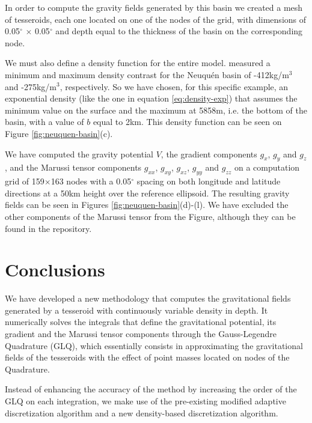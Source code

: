 \documentclass[extra]{gji}
\begin{document}
In order to compute the gravity fields generated by this basin we created a 
mesh of tesseroids, each one located on one of the nodes of the grid, with 
dimensions of 0.05$^\circ$ $\times$ 0.05$^\circ$ and depth equal to the 
thickness of the basin on the corresponding node.

We must also define a density function for the entire model. 
\citet{Sigismondi2012} measured a minimum and maximum density contrast for 
the Neuqu\'en basin of -412kg/m$^3$ and -275kg/m$^3$, respectively.
So we have chosen, for this specific example, an exponential density (like the 
one in equation \ref{eq:density-exp}) that assumes the minimum value on the 
surface and the maximum at 5858m, i.e. the bottom of the basin, with a value 
of $b$ equal to 2km.
This density function can be seen on Figure \ref{fig:neuquen-basin}(c).

We have computed the gravity potential $V$, the gradient components $g_x$, 
$g_y$ and $g_z$, and the Marussi tensor components $g_{xx}$, $g_{xy}$, 
$g_{xz}$, $g_{yy}$  and $g_{zz}$ on a computation grid of 159$\times$163 nodes 
with a 0.05$^\circ$ spacing on both longitude and latitude directions at a 
50km height over the reference ellipsoid.
The resulting gravity fields can be seen in Figures 
\ref{fig:neuquen-basin}(d)-(l).
We have excluded the other components of the Marussi tensor from the Figure, 
although they can be found in the repository.



\section{Conclusions}

We have developed a new methodology that computes the gravitational fields 
generated by a tesseroid with continuously variable density in depth.
It numerically solves the integrals that define the gravitational potential, 
its gradient and the Marussi tensor components through the Gauss-Legendre 
Quadrature (GLQ), which essentially consists in approximating the 
gravitational fields of the tesseroids with the effect of point masses located 
on nodes of the Quadrature.

Instead of enhancing the accuracy of the method by increasing the order of the 
GLQ on each integration, we make use of the pre-existing modified adaptive 
discretization algorithm and a new density-based discretization algorithm.
\end{document}

